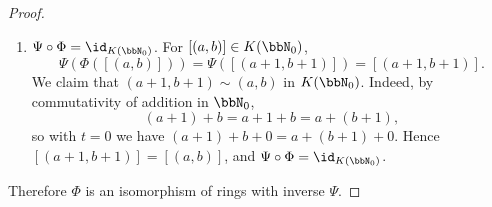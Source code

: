 \begin{proof}
\begin{enumerate}
        \item $\Psi \circ \Phi = \id_{K(\bbN_0)}$. For $[(a,b)] \in K(\bbN_0)$,
        $$\Psi(\Phi([(a,b)])) = \Psi([(a+1,b+1)]) = [(a+1,b+1)].$$
        We claim that $(a+1,b+1) \sim (a,b)$ in $K(\bbN_0)$. Indeed, by commutativity of addition in $\bbN_0$,
        $$(a+1) + b = a + 1 + b = a + (b+1),$$
        so with $t = 0$ we have $(a+1)+b+0 = a+(b+1)+0$. Hence $[(a+1,b+1)] = [(a,b)]$, and $\Psi \circ \Phi = \id_{K(\bbN_0)}$.
    \end{enumerate}

    Therefore $\Phi$ is an isomorphism of rings with inverse $\Psi$.
\end{proof}